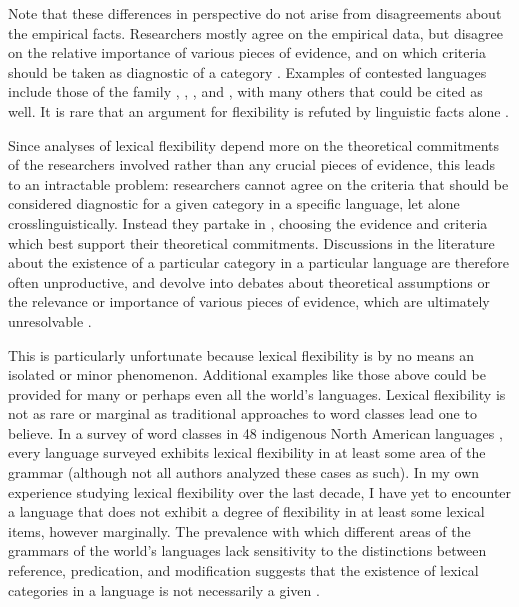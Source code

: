 Note that these differences in perspective do not arise from disagreements about the empirical facts. Researchers mostly agree on the empirical data, but disagree on the relative importance of various pieces of evidence, and on which criteria should be taken as diagnostic of a category \parencites[235]{Wetzer1992}[32]{Stassen1997}[58]{CroftLier2012}. Examples of contested languages include those of the  family \parencite{Chafe2012},  \parencites{EvansOsada2005}{HengeveldRijkhoff2005},  \parencites[17]{SchachterShopen2007}{Floyd2011}, and  \parencites[352]{Robins1968}[62--63]{Hardjadibrata1985}, with many others that could be cited as well. It is rare that an argument for flexibility is refuted by linguistic facts alone .

Since analyses of lexical flexibility depend more on the theoretical commitments of the researchers involved rather than any crucial pieces of evidence, this leads to an intractable problem: researchers cannot agree on the criteria that should be considered diagnostic for a given category in a specific language, let alone crosslinguistically. Instead they partake in  \parencite[30]{Croft2001b}, choosing the evidence and criteria which best support their theoretical commitments. Discussions in the literature about the existence of a particular category in a particular language are therefore often unproductive, and devolve into debates about theoretical assumptions or the relevance or importance of various pieces of evidence, which are ultimately unresolvable \parencite[435]{Croft2005}.

This is particularly unfortunate because lexical flexibility is by no means an isolated or minor phenomenon. Additional examples like those above could be provided for many or perhaps even all the world's languages. Lexical flexibility is not as rare or marginal as traditional approaches to word classes lead one to believe. In a survey of word classes in 48 indigenous North American languages \parencite{Hieberfc}, every language surveyed exhibits lexical flexibility in at least some area of the grammar (although not all authors analyzed these cases as such). In my own experience studying lexical flexibility over the last decade, I have yet to encounter a language that does not exhibit a degree of flexibility in at least some lexical items, however marginally. The prevalence with which different areas of the grammars of the world's languages lack sensitivity to the distinctions between reference, predication, and modification suggests that the existence of lexical categories in a language is not necessarily a given \parencite{Hieberfc}.

